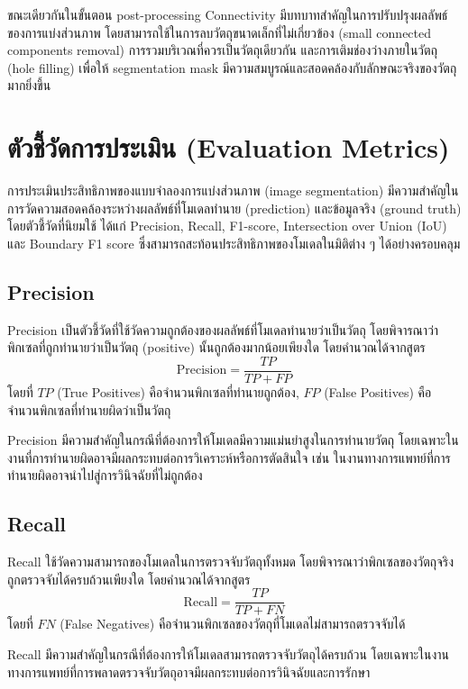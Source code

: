 ขณะเดียวกันในขั้นตอน post-processing Connectivity มีบทบาทสำคัญในการปรับปรุงผลลัพธ์ของการแบ่งส่วนภาพ โดยสามารถใช้ในการลบวัตถุขนาดเล็กที่ไม่เกี่ยวข้อง (small connected components removal) การรวมบริเวณที่ควรเป็นวัตถุเดียวกัน และการเติมช่องว่างภายในวัตถุ (hole filling) เพื่อให้ segmentation mask มีความสมบูรณ์และสอดคล้องกับลักษณะจริงของวัตถุมากยิ่งขึ้น



\section{ตัวชี้วัดการประเมิน (Evaluation Metrics)}
การประเมินประสิทธิภาพของแบบจำลองการแบ่งส่วนภาพ (image segmentation) มีความสำคัญในการวัดความสอดคล้องระหว่างผลลัพธ์ที่โมเดลทำนาย (prediction) และข้อมูลจริง (ground truth) โดยตัวชี้วัดที่นิยมใช้ ได้แก่ Precision, Recall, F1-score, Intersection over Union (IoU) และ Boundary F1 score ซึ่งสามารถสะท้อนประสิทธิภาพของโมเดลในมิติต่าง ๆ ได้อย่างครอบคลุม \cite{powers2011evaluation, everingham2015pascal}

\subsection{Precision}
Precision เป็นตัวชี้วัดที่ใช้วัดความถูกต้องของผลลัพธ์ที่โมเดลทำนายว่าเป็นวัตถุ โดยพิจารณาว่าพิกเซลที่ถูกทำนายว่าเป็นวัตถุ (positive) นั้นถูกต้องมากน้อยเพียงใด โดยคำนวณได้จากสูตร
\begin{equation}
\text{Precision} = \frac{TP}{TP + FP}
\end{equation}
โดยที่ $TP$ (True Positives) คือจำนวนพิกเซลที่ทำนายถูกต้อง, $FP$ (False Positives) คือจำนวนพิกเซลที่ทำนายผิดว่าเป็นวัตถุ 

Precision มีความสำคัญในกรณีที่ต้องการให้โมเดลมีความแม่นยำสูงในการทำนายวัตถุ โดยเฉพาะในงานที่การทำนายผิดอาจมีผลกระทบต่อการวิเคราะห์หรือการตัดสินใจ เช่น ในงานทางการแพทย์ที่การทำนายผิดอาจนำไปสู่การวินิจฉัยที่ไม่ถูกต้อง


\subsection{Recall}
Recall ใช้วัดความสามารถของโมเดลในการตรวจจับวัตถุทั้งหมด โดยพิจารณาว่าพิกเซลของวัตถุจริงถูกตรวจจับได้ครบถ้วนเพียงใด โดยคำนวณได้จากสูตร
\begin{equation}
\text{Recall} = \frac{TP}{TP + FN}
\end{equation}
โดยที่ $FN$ (False Negatives) คือจำนวนพิกเซลของวัตถุที่โมเดลไม่สามารถตรวจจับได้

Recall มีความสำคัญในกรณีที่ต้องการให้โมเดลสามารถตรวจจับวัตถุได้ครบถ้วน โดยเฉพาะในงานทางการแพทย์ที่การพลาดตรวจจับวัตถุอาจมีผลกระทบต่อการวินิจฉัยและการรักษา


